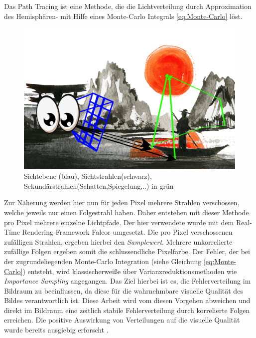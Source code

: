 Das Path Tracing ist eine Methode, die die Lichtverteilung durch Approximation des Hemisphären- mit Hilfe eines Monte-Carlo Integrals
\ref{eq:Monte-Carlo} löst. 

\begin{figure}[H]
    \begin{tcolorbox}
    \centering
    \includegraphics[width=\linewidth]{content/PathTracer/Bilder/PathTracerGuide.png}
    \end{tcolorbox}
    \caption{Sichtebene (blau), Sichtstrahlen(schwarz), Sekundärstrahlen(Schatten,Spiegelung,..) in grün}
    \label{pic::GrundkonzeptPathTracing}
\end{figure}

\vspace*{3cm} 
Zur Näherung werden hier nun für jeden Pixel mehrere Strahlen verschossen, welche jeweils nur einen Folgestrahl haben. Daher entstehen
mit dieser Methode pro Pixel mehrere einzelne Lichtpfade.
Der hier verwendete  wurde mit dem Real-Time Rendering Framework Falcor \cite{Benty18} umgesetzt.
Die pro Pixel verschossenen zufälligen Strahlen, ergeben hierbei den \textit{Samplewert}. Mehrere
unkorrelierte zufällige Folgen ergeben somit die schlussendliche Pixelfarbe. Der Fehler, der 
bei der zugrundeliegenden Monte-Carlo Integration (siehe Gleichung \ref{eq:Monte-Carlo}) entsteht, 
wird klassischerweiße über Varianzreduktionsmethoden wie \textit{Importance Sampling}
angegangen.
Das Ziel hierbei ist es, die Fehlerverteilung im Bildraum zu beeinflussen, da diese für die wahrnehmbare 
visuelle Qualität des Bildes verantwortlich ist. Diese Arbeit wird vom diesen Vorgehen abweichen und direkt im 
Bildraum eine zeitlich stabile 
Fehlerverteilung durch korrelierte Folgen erreichen. Die positive Auswirkung von  
Verteilungen auf die visuelle Qualität wurde bereits ausgiebig erforscht \cite{3288}.
\vfill

